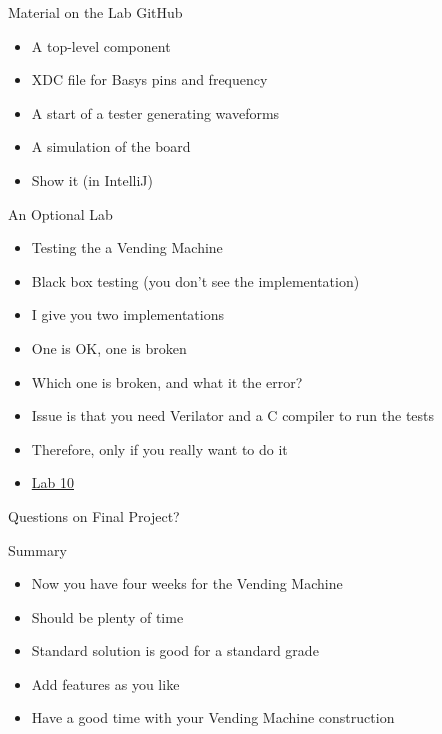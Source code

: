 \begin{frame}[fragile]{Material on the Lab GitHub}
\begin{itemize}
\item A top-level component
\item XDC file for Basys pins and frequency
\item A start of a tester generating waveforms
\item A simulation of the board
\item Show it (in IntelliJ)
\end{itemize}
\end{frame}

\begin{frame}[fragile]{An Optional Lab}
\begin{itemize}
\item Testing the a Vending Machine
\item Black box testing (you don't see the implementation)
\item I give you two implementations
\item One is OK, one is broken
\item Which one is broken, and what it the error?
\item Issue is that you need Verilator and a C compiler to run the tests
\item Therefore, only if you really want to do it
\item \href{https://github.com/schoeberl/chisel-lab/tree/master/lab10}{Lab 10}
\end{itemize}
\end{frame}


\begin{frame}[fragile]{Questions on Final Project?}
\end{frame}


\begin{frame}[fragile]{Summary}
\begin{itemize}
\item Now you have four weeks for the Vending Machine
\item Should be plenty of time
\item Standard solution is good for a standard grade
\item Add features as you like
\item Have a good time with your Vending Machine construction
\end{itemize}
\end{frame}





